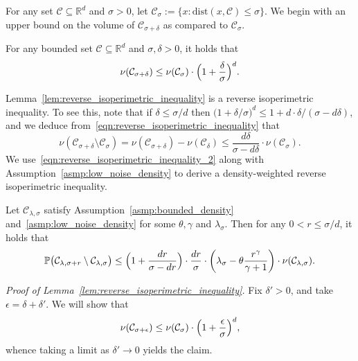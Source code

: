 \documentclass[twoside,11pt]{article}
\newcommand{\Reals}{\mathbb{R}}
\newcommand{\1}{\mathbf{1}}
\newcommand{\Rd}{\Reals^d}
\newcommand{\mc}[1]{\mathcal{#1}}
\newcommand{\Pbb}{\mathbb{P}}
\begin{document}
For any set $\mc{C} \subseteq \Rd$ and $\sigma > 0$, let $\mc{C}_{\sigma} := \{x: \mathrm{dist}(x,\mc{C}) \leq \sigma\}$. We begin with an upper bound on the volume of $\mc{C}_{\sigma + \delta}$ as compared to $\mc{C}_{\sigma}$. 
\begin{lemma}
	\label{lem:reverse_isoperimetric_inequality}
	For any bounded set $\mc{C} \subseteq \Rd$ and  $\sigma, \delta > 0$, it holds that
	\begin{equation}
	\label{eqn:reverse_isoperimetric_inequality}
	\nu(\mc{C}_{\sigma + \delta}) \leq \nu(\mc{C}_{\sigma}) \cdot \Bigl(1 + \frac{\delta}{\sigma}\Bigr)^d.
	\end{equation}
\end{lemma}
Lemma~\ref{lem:reverse_isoperimetric_inequality} is a reverse isoperimetric inequality. To see this, note that if $\delta \leq \sigma/d$ then $\bigl(1 + \delta/\sigma\bigr)^d \leq 1 + d \cdot \delta/(\sigma - d\delta)$, and we deduce from~\eqref{eqn:reverse_isoperimetric_inequality} that
\begin{equation}
\label{eqn:reverse_isoperimetric_inequality_2}
\nu(\mc{C}_{\sigma + \delta} \setminus \mc{C}_{\sigma}) = \nu(\mc{C}_{\sigma + \delta}) - \nu(\mc{C}_{\delta}) \leq \frac{d\delta}{\sigma - d\delta} \cdot \nu(\mc{C}_{\sigma}).
\end{equation}
We use~\eqref{eqn:reverse_isoperimetric_inequality_2} along with Assumption~\ref{asmp:low_noise_density} to derive a density-weighted reverse isoperimetric inequality. 
\begin{lemma}
	\label{lem:reverse_isoperimetric_inequality_density_weighted}
	Let $\mc{C}_{\lambda,\sigma}$ satisfy Assumption~\ref{asmp:bounded_density} and~\ref{asmp:low_noise_density} for some $\theta, \gamma$ and $\lambda_{\sigma}$. Then for any $0 < r \leq \sigma/d$, it holds that
	\begin{equation}
	\label{eqn:reverse_isoperimetric_inequality_density_weighted}
	\Pbb\bigl(\mc{C}_{\lambda,\sigma + r} \setminus \mc{C}_{\lambda,\sigma}\bigr) \leq \Bigl(1 + \frac{dr}{\sigma - dr}\Bigr) \cdot \frac{dr}{\sigma} \cdot \left(\lambda_{\sigma} - \theta\frac{r^{\gamma}}{\gamma + 1}\right) \cdot \nu(\mc{C}_{\lambda,\sigma}).
	\end{equation}
\end{lemma}
\emph{Proof of Lemma~\ref{lem:reverse_isoperimetric_inequality}.}
Fix $\delta' > 0$, and take $\epsilon = \delta + \delta'$. We will show that
\begin{equation}
\label{pf:reverse_isoperimetric_inequality}
\nu(\mc{C}_{\sigma + \epsilon}) \leq \nu(\mc{C}_{\sigma}) \cdot \Bigl(1 + \frac{\epsilon}{\sigma}\Bigr)^d,
\end{equation}
whence taking a limit as $\delta' \to 0$ yields the claim.
\end{document}
